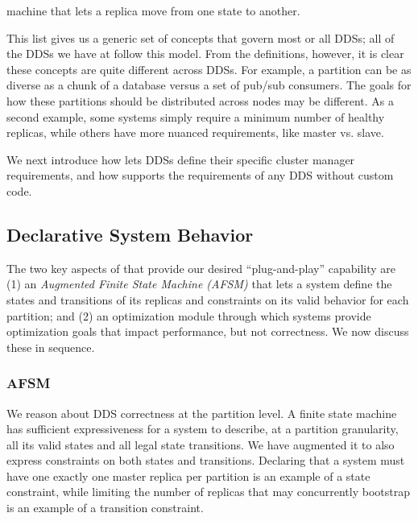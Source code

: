 machine that lets a replica move from one state to another. 
\squishend

This list gives us a generic set of concepts that govern most or all DDSs; all
of the DDSs we have at \linkedin follow this model.  From the definitions,
however, it is clear these concepts are quite different across DDSs.  For
example, a partition can be as diverse as a chunk of a database versus a set of
pub/sub consumers.  The goals for how these partitions should be distributed
across nodes may be different.  As a second example, some systems simply require
a minimum number of healthy replicas, while others have more nuanced
requirements, like master vs. slave.  

We next introduce how \helix lets DDSs define their specific cluster manager
requirements, and how \helix supports the requirements of any DDS without custom
code.

\subsection{Declarative System Behavior}
\label{sec:pluggability}
%
The two key aspects of \helix that provide our desired ``plug-and-play'' capability 
are (1) an \emph{Augmented Finite State Machine (AFSM)} that lets a system
define the states and transitions of its replicas and constraints on 
its valid behavior for each partition; and (2) an optimization module 
through which systems provide optimization goals that impact performance, but not
correctness.  We now discuss these in sequence.
  
\subsubsection{AFSM}
\label{sec:afsm}
%
We reason about DDS correctness at the partition level. 
A finite state machine has sufficient expressiveness for a system to describe,
at a 
partition granularity, all its valid states and all legal 
state transitions.  We have augmented it to also express constraints on both
states and transitions.  Declaring that a system must have one exactly one
master replica per partition is an example of a state constraint, while limiting
the number of replicas that may concurrently bootstrap is an example of a
transition constraint.   

